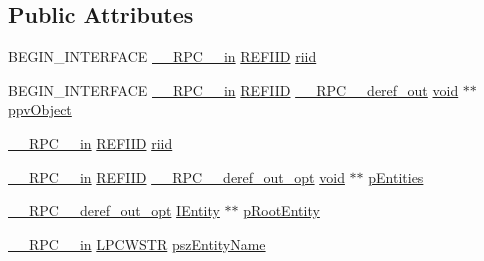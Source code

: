 \subsection*{Public Attributes}
\begin{DoxyCompactItemize}
\item 
B\+E\+G\+I\+N\+\_\+\+I\+N\+T\+E\+R\+F\+A\+CE \hyperlink{rpcsal_8h_a20b7f6da600a05c8b541659f14f7f0e6}{\+\_\+\+\_\+\+R\+P\+C\+\_\+\+\_\+in} \hyperlink{px__win__ds_8c_a80ec49c8ae61e234197d5071d2df497d}{R\+E\+F\+I\+ID} \hyperlink{struct_i_schema_provider_vtbl_a6e74123e89914a4bad51108607afcfa4}{riid}
\item 
B\+E\+G\+I\+N\+\_\+\+I\+N\+T\+E\+R\+F\+A\+CE \hyperlink{rpcsal_8h_a20b7f6da600a05c8b541659f14f7f0e6}{\+\_\+\+\_\+\+R\+P\+C\+\_\+\+\_\+in} \hyperlink{px__win__ds_8c_a80ec49c8ae61e234197d5071d2df497d}{R\+E\+F\+I\+ID} \hyperlink{rpcsal_8h_a23bc188526f10656f9c79d950f6c3192}{\+\_\+\+\_\+\+R\+P\+C\+\_\+\+\_\+deref\+\_\+out} \hyperlink{sound_8c_ae35f5844602719cf66324f4de2a658b3}{void} $\ast$$\ast$ \hyperlink{struct_i_schema_provider_vtbl_a9911f9c2c659cd367b857be6a3c7b009}{ppv\+Object}
\item 
\hyperlink{rpcsal_8h_a20b7f6da600a05c8b541659f14f7f0e6}{\+\_\+\+\_\+\+R\+P\+C\+\_\+\+\_\+in} \hyperlink{px__win__ds_8c_a80ec49c8ae61e234197d5071d2df497d}{R\+E\+F\+I\+ID} \hyperlink{struct_i_schema_provider_vtbl_a6e74123e89914a4bad51108607afcfa4}{riid}
\item 
\hyperlink{rpcsal_8h_a20b7f6da600a05c8b541659f14f7f0e6}{\+\_\+\+\_\+\+R\+P\+C\+\_\+\+\_\+in} \hyperlink{px__win__ds_8c_a80ec49c8ae61e234197d5071d2df497d}{R\+E\+F\+I\+ID} \hyperlink{rpcsal_8h_ab29e89ceb0eb0b075c6f6299b0de6a21}{\+\_\+\+\_\+\+R\+P\+C\+\_\+\+\_\+deref\+\_\+out\+\_\+opt} \hyperlink{sound_8c_ae35f5844602719cf66324f4de2a658b3}{void} $\ast$$\ast$ \hyperlink{struct_i_schema_provider_vtbl_a6879fc9423f13eec1f0e4cf29fd98b47}{p\+Entities}
\item 
\hyperlink{rpcsal_8h_ab29e89ceb0eb0b075c6f6299b0de6a21}{\+\_\+\+\_\+\+R\+P\+C\+\_\+\+\_\+deref\+\_\+out\+\_\+opt} \hyperlink{structuredquery_8h_a9dd08456b6bfe208b5aa2ea5c533b490}{I\+Entity} $\ast$$\ast$ \hyperlink{struct_i_schema_provider_vtbl_aeb31f39a96c1c0f2d585029bfcabf9bd}{p\+Root\+Entity}
\item 
\hyperlink{rpcsal_8h_a20b7f6da600a05c8b541659f14f7f0e6}{\+\_\+\+\_\+\+R\+P\+C\+\_\+\+\_\+in} \hyperlink{mapinls_8h_a25fda90f83ded0efd5456a4e7eda1e0c}{L\+P\+C\+W\+S\+TR} \hyperlink{struct_i_schema_provider_vtbl_a25a13eed002aebcaa5378479f185e2c9}{psz\+Entity\+Name}
\item 
$$
\end{DoxyCompactItemize}
